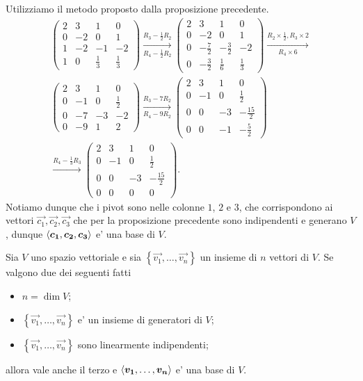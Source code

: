 \begin{solution}
    Utilizziamo il metodo proposto dalla proposizione precedente. 
    \begin{gather*}
        \begin{pmatrix}
            2&3&1&0\\0&-2&0&1\\1&-2&-1&-2\\1&0&\frac{1}{3}&\frac13
        \end{pmatrix} \xrightarrow[R_4 - \frac{1}{2}R_2]{R_3 - \frac{1}{2}R_2}
        \begin{pmatrix}
            2&3&1&0\\0&-2&0&1\\0&-\frac72&-\frac32&-2\\0&-\frac{3}{2}&\frac{1}{6}&\frac13
        \end{pmatrix} \xrightarrow[R_4 \times 6]{R_2\times \frac12, R_3\times 2} \\
        \begin{pmatrix}
            2&3&1&0\\0&-1&0&\frac12\\0&-7&-3&-2\\0&-9&1&2
        \end{pmatrix} \xrightarrow[R_4-9R_2]{R_3 -7R_2} 
        \begin{pmatrix}
            2&3&1&0\\0&-1&0&\frac12\\0&0&-3&-\frac{15}{2}\\0&0&-1&-\frac{5}{2}
        \end{pmatrix}\\ \xrightarrow[]{R_4 -\frac13R_3} 
        \begin{pmatrix}
            2&3&1&0\\0&-1&0&\frac12\\0&0&-3&-\frac{15}{2}\\0&0&0&0
        \end{pmatrix}.
    \end{gather*}
    Notiamo dunque che i pivot sono nelle colonne $1$, $2$ e $3$, che corrispondono ai vettori $\vec{c_1}, \vec{c_2}, \vec{c_3}$ che per la proposizione precedente sono indipendenti e generano $V$, dunque $\left\langle \bm{c_1}, \bm{c_2}, \bm{c_3} \right\rangle$ e' una base di $V$.
\end{solution}

\begin{proposition}\label{base=dim_gener_indip}
    Sia $V$ uno spazio vettoriale e sia $\left\{\vec{v_1}, \dots, \vec{v_n} \right\}$ un insieme di $n$ vettori di $V$. Se valgono due dei seguenti fatti
    \begin{itemize}
        \item $n = \dim V$;
        \item $\left\{\vec{v_1}, \dots, \vec{v_n} \right\}$ e' un insieme di generatori di $V$;
        \item $\left\{\vec{v_1}, \dots, \vec{v_n} \right\}$ sono linearmente indipendenti;
    \end{itemize}
    allora vale anche il terzo e $\left\langle \bm{v_1}, \dots, \bm{v_n} \right\rangle$ e' una base di $V$.
\end{proposition}

